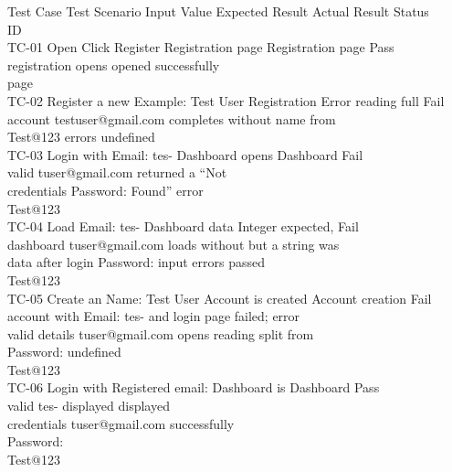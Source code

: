 \documentclass[12pt,a4paper]{report}
\begin{document}
\smallskip
Test Case Test Scenario Input Value            Expected Result Actual Result             Status\\ 
ID\\ 
TC-01      Open            Click Register      Registration page   Registration page     Pass\\ 
registration                        opens               opened successfully\\ 
page\\ 
TC-02      Register a new Example: Test User Registration          Error reading full    Fail\\ 
account         testuser@gmail.com completes without name from\\ 
Test@123            errors              undefined\\ 
TC-03      Login with      Email: tes-         Dashboard opens     Dashboard             Fail\\ 
valid           tuser@gmail.com                         returned a “Not\\ 
credentials     Password:                               Found” error\\ 
Test@123\\ 
TC-04      Load            Email: tes-         Dashboard data      Integer expected,     Fail\\ 
dashboard       tuser@gmail.com     loads without       but a string was\\ 
data after login Password:          input errors        passed\\ 
Test@123\\ 
TC-05      Create an       Name: Test User     Account is created Account creation       Fail\\ 
account with    Email: tes-         and login page      failed; error\\ 
valid details   tuser@gmail.com     opens               reading split from\\ 
Password:                               undefined\\ 
Test@123\\ 
TC-06      Login with      Registered email:   Dashboard is        Dashboard             Pass\\ 
valid           tes-                displayed           displayed\\ 
credentials     tuser@gmail.com                         successfully\\ 
Password:\\ 
Test@123\\ 
\end{document}
